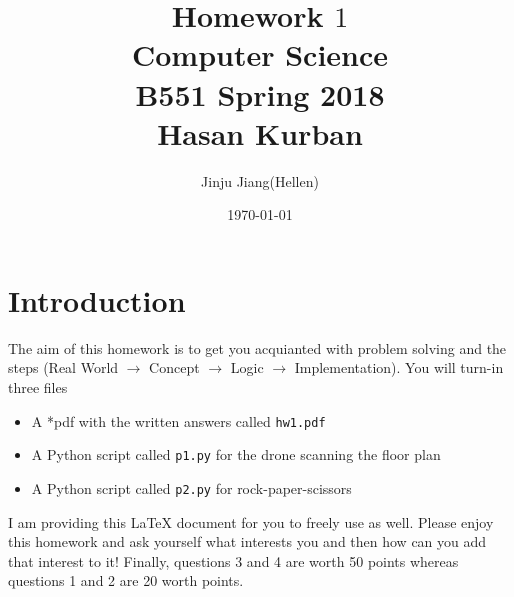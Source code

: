 \documentclass{article}
\begin{document}
\title{Homework $1$\\ Computer Science \\ B551 Spring 2018\\ Hasan Kurban}         %
\author{Jinju Jiang(Hellen)}        %
\date{\today}          %
\maketitle


\makeatother     %




\pagestyle{plain}
\section*{Introduction}
The aim of this homework is to get you acquianted with problem solving and the steps  (Real World $\rightarrow$ Concept $\rightarrow$ Logic  $\rightarrow$ Implementation).  You will turn-in three files\begin{itemize} \item A *pdf with the written answers called \texttt{hw1.pdf} \item A Python script called \texttt{p1.py} for the drone scanning the floor plan \item  A Python script called  \texttt{p2.py} for rock-paper-scissors \end{itemize}  I am providing this \LaTeX{} document for you to freely use as well. Please enjoy this homework and ask yourself what interests you and then how can you add that interest to it!  Finally,  questions 3  and 4  are worth 50 points whereas questions 1 and 2 are 20  worth points.
\newpage
\end{document}
